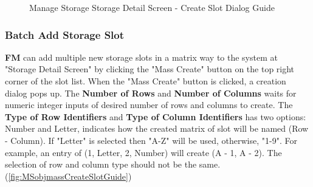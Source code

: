\begin{figure}[H]
	\centering
    \hspace{10pt}
  
    \vspace{10pt}
    
    \caption{Manage Storage Storage Detail Screen - Create Slot Dialog Guide}
	\label{fig:MSobjCreateSlotGuide}
\end{figure}


\subsubsection{Batch Add Storage Slot}

\textbf{FM} can add multiple new storage slots in a matrix way to the system at "Storage Detail Screen" by clicking the "Mass Create" button on the top right corner of the slot list.
When the "Mass Create" button is clicked, a creation dialog pops up. The \textbf{Number of Rows} and \textbf{Number of Columns} waits for numeric integer inputs of desired number of rows and columns to create. The \textbf{Type of Row Identifiers} and \textbf{Type of Column Identifiers} has two options: Number and Letter, indicates how the created matrix of slot will be named (Row - Column). If "Letter" is selected then "A-Z" will be used, otherwise, "1-9". For example, an entry of (1, Letter, 2, Number) will create (A - 1, A - 2). The selection of row and column type should not be the same.
(\autoref{fig:MSobjmassCreateSlotGuide})

